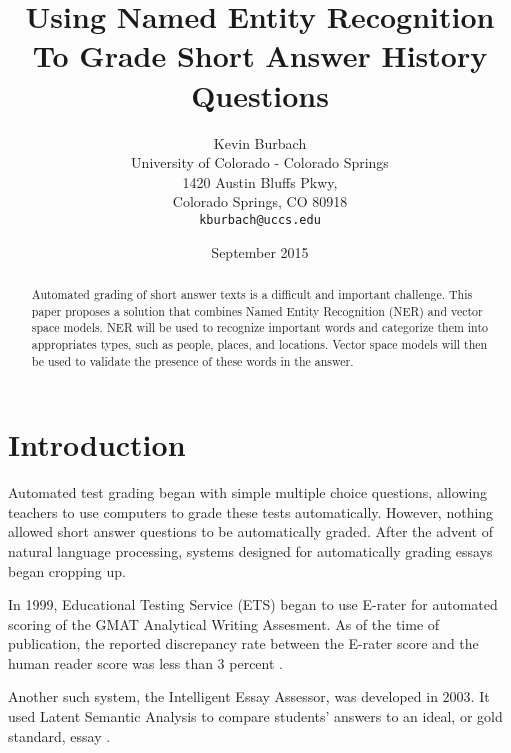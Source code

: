 \documentclass{sig-alternate}
\begin{document}
\title{Using Named Entity Recognition To Grade Short Answer History Questions}
\author{Kevin Burbach\\
        University of Colorado - Colorado Springs\\
        1420 Austin Bluffs Pkwy,\\
        Colorado Springs, CO 80918\\
        \texttt{kburbach@uccs.edu}
       }
\date{September 2015}

\maketitle

\begin{abstract}
   Automated grading of short answer texts is a difficult and important challenge. This paper proposes a solution that combines Named Entity Recognition (NER) and vector space models. NER will be used to recognize important words and categorize them into appropriates types, such as people, places, and locations. Vector space models will then be used to validate the presence of these words in the answer.
\end{abstract}

\section{Introduction}
Automated test grading began with simple multiple choice questions, allowing teachers to use computers to grade these tests automatically. However, nothing allowed short answer questions to be automatically graded. After the advent of natural language processing, systems designed for automatically grading essays began cropping up.

In 1999, Educational Testing Service (ETS) began to use E-rater for automated scoring of the GMAT Analytical Writing Assesment. As of the time of publication, the reported discrepancy rate between the E-rater score and the human reader score was less than 3 percent \cite{burstein_pdf}. 

Another such system, the Intelligent Essay Assessor, was developed in 2003. It used Latent Semantic Analysis to compare students' answers to an ideal, or gold standard, essay \cite{auto_marking}.





{}

\end{document}
